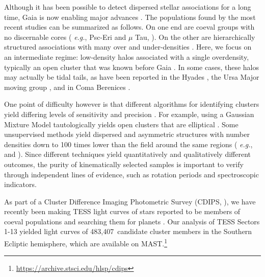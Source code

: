 \documentclass[12pt,twocolumn,tighten]{aastex63}
\newcommand{\numsouthernuniqlcs}{483{,}407} %
\begin{document}
Although it has been possible to detect dispersed stellar associations
for a long time, Gaia is now enabling major advances \citep[{\it
e.g.},][]{de_zeeuw_hipparcos_1999,bergond_gravitational_2001,zuckerman_young_2004,oh_comoving_2017,cantatgaudin_gaia_2018,gagne_banyan_XII_2018,gagne_banyan_XIII_2018,kounkel_apogee2_2018,zari_3d_2018,kounkel_untangling_2019,furnkranz_comabernbhr_2019}.
The populations found by the most recent studies can be summarized as
follows.  On one end are coeval groups with no discernable cores ({\it
e.g.}, Psc-Eri and $\mu$ Tau,
\citealt{meingast_psceri_2019,curtis_tess_2019,gagne_mutau_2020}).  On
the other are hierarchically structured associations with many over
and under-densities  \citep[{\it e.g.} the Sco-Cen and Vela
associations,][]{pecaut_star_2016,cantatgaudin_velaOB2_2019}.  Here,
we focus on an intermediate regime: low-density halos associated with
a single overdensity, typically an open cluster that was known before
Gaia
\citep[see][]{kounkel_untangling_2019,kounkel_untanglingII_2020,meingast_2021}.
In some cases, these halos may actually be tidal tails, as have been
reported in the Hyades \citep{meingast_hyades_2019,roser_hyades_2019},
the Ursa Major moving group \citep{gagne_lowmassUMA_2020}, and in Coma
Berenices \citep{tang_comaber_2019,furnkranz_2019}. 

One point of difficulty however is that different algorithms for
identifying clusters yield differing levels of sensitivity and
precision \citep{hunt_clustering_2020}.  For example, using a Gaussian
Mixture Model tautologically yields open clusters that are elliptical
\citep[{\it e.g.},][]{wallace_m4_2018}.  Some unsupervised methods
yield dispersed and asymmetric structures with number densities down
to 100 times lower than the field around the same regions ({\it
e.g.}, \citealt{kounkel_untangling_2019} and \citealt{meingast_2021}).
Since different techniques yield quantitatively and
qualitatively different outcomes, the purity of kinematically selected
samples is important to verify through independent lines of evidence,
such as rotation periods and spectroscopic indicators.

As part of a Cluster Difference Imaging Photometric Survey (CDIPS,
\citealt{bouma_cdipsI_2019}), we have recently been making TESS light
curves of stars reported to be members of coeval populations and
searching them for planets \citep{bouma_cluster_2020}.  Our analysis
of TESS Sectors 1-13 yielded light curves of \numsouthernuniqlcs\
candidate cluster members in the Southern Ecliptic hemisphere, which
are available on
MAST.\footnote{\url{https://archive.stsci.edu/hlsp/cdips}}
\end{document}
